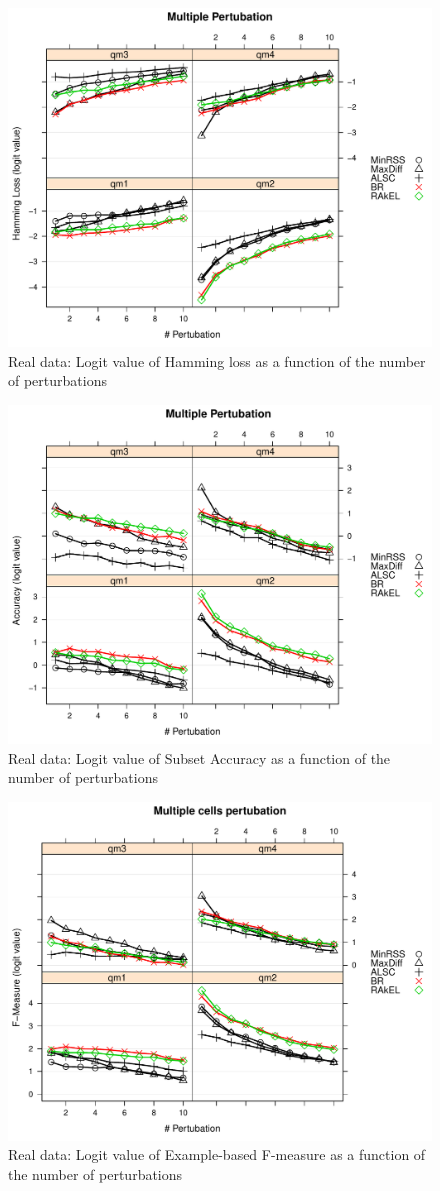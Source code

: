 \documentclass[11pt]{article}
\begin{document}
\begin{figure}
  \centering
    \includegraphics[width=100 mm ,scale=0.25]{graph/HL.pdf}
  \caption{Real data: Logit value of Hamming loss as a function of the number of perturbations}\label{fig:HLforReal}
\end{figure}

\begin{figure}
  \centering
    \includegraphics[width=100 mm ,scale=0.25]{graph/SA.pdf}
  \caption{Real data: Logit value of Subset Accuracy as a function of the number of perturbations}\label{fig:SAforReal}
\end{figure}

\begin{figure}
  \centering
    \includegraphics[width=100 mm ,scale=0.25]{graph/FM.pdf}
    \caption{Real data: Logit value of Example-based F-measure as a function of the number of perturbations}\label{fig:FMforReal}
\end{figure}
\end{document}
